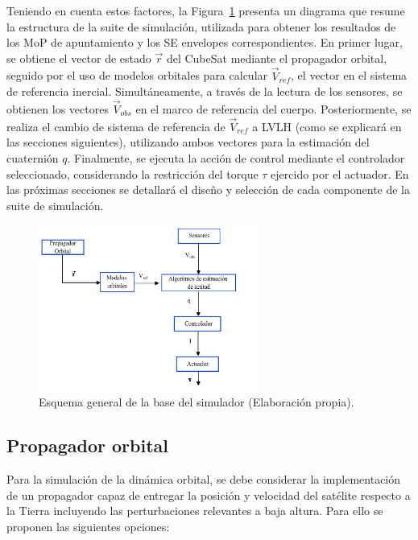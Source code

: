 Teniendo en cuenta estos factores, la Figura~\ref{fig:bloq_gen} presenta un diagrama que resume la estructura de la suite de simulación, utilizada para obtener los resultados de los  MoP de apuntamiento y los SE envelopes correspondientes. En primer lugar, se obtiene el vector de estado $\vec{r}$ del CubeSat mediante el propagador orbital, seguido por el uso de modelos orbitales para calcular $\vec{V}_{ref}$, el vector en el sistema de referencia inercial. Simultáneamente, a través de la lectura de los sensores, se obtienen los vectores $\vec{V}_{obs}$ en el marco de referencia del cuerpo. Posteriormente, se realiza el cambio de sistema de referencia de $\vec{V}_{ref}$ a \gls{LVLH} (como se explicará en las secciones siguientes), utilizando ambos vectores para la estimación del cuaternión $q$. Finalmente, se ejecuta la acción de control mediante el controlador seleccionado, considerando la restricción del torque $\tau$ ejercido por el actuador. En las próximas secciones se detallará el diseño y selección de cada componente de la suite de simulación.

\begin{figure}[h]
	\centering    
	\includegraphics[width=0.65\textwidth]{bloques_generico.pdf}
	\caption{Esquema general de la base del simulador (Elaboración propia).}
	\label{fig:bloq_gen}
\end{figure}

\subsection{Propagador orbital}

Para la simulación de la dinámica orbital, se debe considerar la implementación de un propagador capaz de entregar la posición y velocidad del satélite respecto a la Tierra incluyendo las perturbaciones relevantes a baja altura. Para ello se proponen las siguientes opciones:


